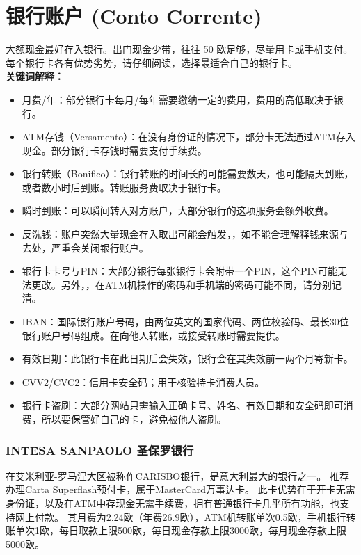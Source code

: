 \section{银行账户 (Conto Corrente)}

大额现金最好存入银行。出门现金少带，往往 50 欧足够，尽量用卡或手机支付。
每个银行卡各有优势劣势，请仔细阅读，选择最适合自己的银行卡。\\
\textbf{关键词解释：}\\
\begin{itemize}
\item 月费/年：部分银行卡每月/每年需要缴纳一定的费用，费用的高低取决于银行。
\item ATM存钱（Versamento）：在没有身份证的情况下，部分卡无法通过ATM存入现金。部分银行卡存钱时需要支付手续费。
\item 银行转账（Bonifico）：银行转账的时间长的可能需要数天，也可能隔天到账，或者数小时后到账。转账服务费取决于银行卡。
\item 瞬时到账：可以瞬间转入对方账户，大部分银行的这项服务会额外收费。
\item 反洗钱：账户突然大量现金存入取出可能会触发，，如不能合理解释钱来源与去处，严重会关闭银行账户。
\item 银行卡卡号与PIN：大部分银行每张银行卡会附带一个PIN，这个PIN可能无法更改。另外，，在ATM机操作的密码和手机端的密码可能不同，请分别记清。
\item IBAN：国际银行账户号码，由两位英文的国家代码、两位校验码、最长30位银行账户号码组成。在向他人转账，或接受转账时需要提供。
\item 有效日期：此银行卡在此日期后会失效，银行会在其失效前一两个月寄新卡。
\item CVV2/CVC2：信用卡安全码；用于核验持卡消费人员。
\item 银行卡盗刷：大部分网站只需输入正确卡号、姓名、有效日期和安全码即可消费，所以要保管好自己的卡，避免被他人盗刷。
\end{itemize}

\subsubsection{INTESA SANPAOLO 圣保罗银行}

在艾米利亚-罗马涅大区被称作CARISBO银行，是意大利最大的银行之一。
推荐办理Carta Superflash预付卡，属于MasterCard万事达卡。
此卡优势在于开卡无需身份证，以及在ATM中存现金无需手续费，拥有普通银行卡几乎所有功能，也支持网上付款。
其月费为2.24欧（年费26.9欧），ATM机转账单次0.5欧，手机银行转账单次1欧，每日取款上限500欧，每日现金存款上限3000欧，每月现金存款上限5000欧。

